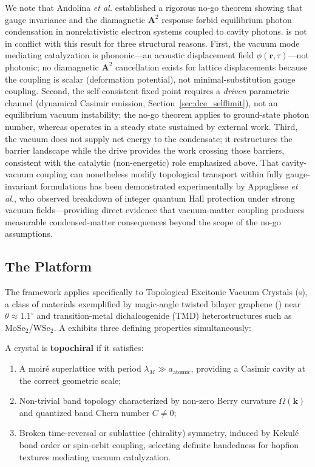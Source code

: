 \documentclass[11pt,letterpaper]{article}
\begin{document}
We note that Andolina \textit{et al.}\cite{Andolina2019} established a rigorous no-go theorem showing that gauge invariance and the diamagnetic $\mathbf{A}^2$ response forbid equilibrium photon condensation in nonrelativistic electron systems coupled to cavity photons. \QVC{} is not in conflict with this result for three structural reasons. First, the vacuum mode mediating catalyzation is phononic---an acoustic displacement field $\phi(\mathbf{r},\tau)$---not photonic; no diamagnetic $\mathbf{A}^2$ cancellation exists for lattice displacements because the coupling is scalar (deformation potential), not minimal-substitution gauge coupling. Second, the self-consistent fixed point requires a \textit{driven} parametric channel (dynamical Casimir emission, Section~\ref{sec:dce_selflimit}), not an equilibrium vacuum instability; the no-go theorem applies to ground-state photon number, whereas \QVC{} operates in a steady state sustained by external work. Third, the vacuum does not supply net energy to the condensate; it restructures the barrier landscape while the drive provides the work crossing those barriers, consistent with the catalytic (non-energetic) role emphasized above. That cavity-vacuum coupling can nonetheless modify topological transport within fully gauge-invariant formulations has been demonstrated experimentally by Appugliese \textit{et al.}\cite{Appugliese2022}, who observed breakdown of integer quantum Hall protection under strong vacuum fields---providing direct evidence that vacuum-matter coupling produces measurable condensed-matter consequences beyond the scope of the no-go assumptions.

\subsection{The \TEVC{} Platform}

The framework applies specifically to Topological Excitonic Vacuum Crystals (\TEVC{}s), a class of materials exemplified by magic-angle twisted bilayer graphene (\MATBG) near $\theta \approx 1.1^\circ$\cite{Cao2018correlated,Cao2018unconventional} and transition-metal dichalcogenide (TMD) heterostructures such as MoSe$_2$/WSe$_2$\cite{Regan2020,Tang2020}. A \TEVC{} exhibits three defining properties simultaneously:

\begin{definition}[Topochirality]
A crystal is \textbf{topochiral} if it satisfies:
\begin{enumerate}
    \item A moiré superlattice with period $\lambda_M \gg a_{\text{atomic}}$, providing a Casimir cavity at the correct geometric scale;
    \item Non-trivial band topology characterized by non-zero Berry curvature $\Omega(\mathbf{k})$ and quantized band Chern number $C \neq 0$;
    \item Broken time-reversal or sublattice (chirality) symmetry, induced by Kekulé bond order\cite{Gutierrez2016} or spin-orbit coupling, selecting definite handedness for hopfion textures mediating vacuum catalyzation.
\end{enumerate}
\end{definition}
\end{document}
